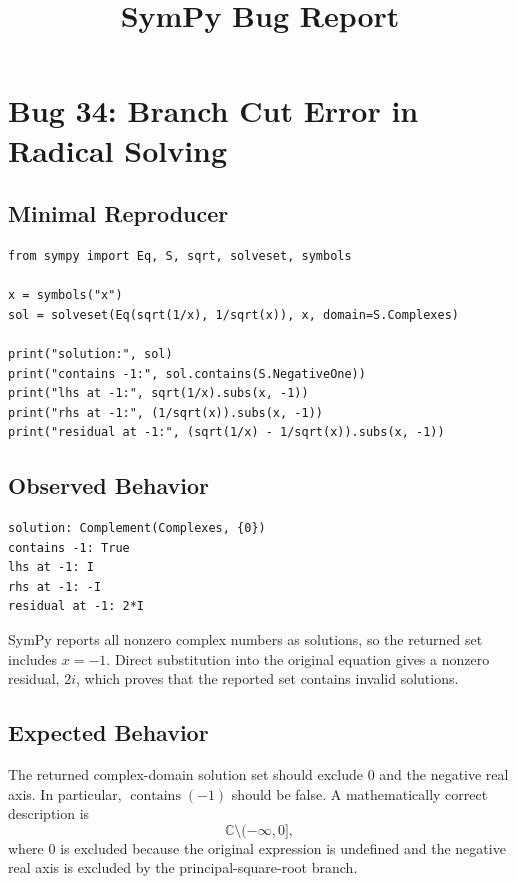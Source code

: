 \documentclass[11pt]{article}
\title{SymPy Bug Report}
\author{}
\date{}
\begin{document}
\maketitle

\section{Bug 34: Branch Cut Error in Radical Solving}

\subsection{Minimal Reproducer}

\medskip

\begin{lstlisting}[style=bugpython]
from sympy import Eq, S, sqrt, solveset, symbols

x = symbols("x")
sol = solveset(Eq(sqrt(1/x), 1/sqrt(x)), x, domain=S.Complexes)

print("solution:", sol)
print("contains -1:", sol.contains(S.NegativeOne))
print("lhs at -1:", sqrt(1/x).subs(x, -1))
print("rhs at -1:", (1/sqrt(x)).subs(x, -1))
print("residual at -1:", (sqrt(1/x) - 1/sqrt(x)).subs(x, -1))
\end{lstlisting}

\subsection{Observed Behavior}

\medskip

\begin{lstlisting}[style=bugpython]
solution: Complement(Complexes, {0})
contains -1: True
lhs at -1: I
rhs at -1: -I
residual at -1: 2*I
\end{lstlisting}

SymPy reports all nonzero complex numbers as solutions, so the returned set includes \(x=-1\). Direct substitution into the original equation gives a nonzero residual, \(2i\), which proves that the reported set contains invalid solutions.

\subsection{Expected Behavior}

The returned complex-domain solution set should exclude \(0\) and the negative real axis. In particular, \(\operatorname{contains}(-1)\) should be false. A mathematically correct description is
\[
    \mathbb{C} \setminus (-\infty,0],
\]
where \(0\) is excluded because the original expression is undefined and the negative real axis is excluded by the principal-square-root branch.
\end{document}
